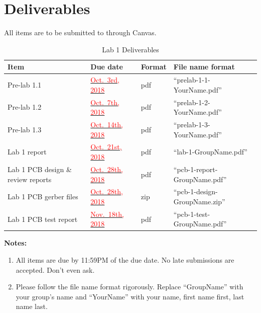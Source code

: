 \documentclass[letterpaper, 11pt]{article}
\newcommand{\due}[1]{\href{https://github.com/ucdart/UCD-EEC134/blob/master/support/schedule/eec134-schedule.pdf}{\textcolor{red}{#1}}}
\begin{document}
\newpage
\section{Deliverables}
All items are to be submitted to through Canvas.  

\vspace{0.5cm}

\begin{table}[h]
	\footnotesize
	\caption{Lab 1 Deliverables}
	\renewcommand{\arraystretch}{1.2}
	\begin{tabular}{|m{1in}|l|m{0.45in}|m{2in}|}
		\hline
		\textbf{Item} & \textbf{Due date} & \textbf{Format} & \textbf{File name format} \\
		\hline \hline
		Pre-lab 1.1 & \due{Oct.~3rd, 2018 } & pdf & ``prelab-1-1-YourName.pdf'' \\
		\hline
		Pre-lab 1.2 & \due{Oct.~7th, 2018} & pdf & ``prelab-1-2-YourName.pdf''\\
		\hline
		Pre-lab 1.3 & \due{Oct.~14th, 2018} & pdf & ``prelab-1-3-YourName.pdf''\\
		\hline
		Lab 1 report & \due{Oct.~21st, 2018 } & pdf & ``lab-1-GroupName.pdf''\\
		\hline
		Lab 1 PCB design \& review reports & \due{Oct.~28th, 2018 } & pdf & ``pcb-1-report-GroupName.pdf''\\
		\hline
		Lab 1 PCB gerber files & \due{Oct.~28th, 2018 } & zip & ``pcb-1-design-GroupName.zip''\\
		\hline
		Lab 1 PCB test report & \due{Nov.~18th, 2018 } & pdf & ``pcb-1-test-GroupName.pdf''\\
		\hline
	\end{tabular}
	\label{tab:deliverables}
\end{table}

\textbf{Notes:}
\begin{enumerate}
	\item All items are due by 11:59PM of the due date. No late submissions are accepted. Don't even ask. 
	
	\item Please follow the file name format rigorously. Replace ``GroupName'' with your group's name and ``YourName'' with your name, first name first, last name last. 
\end{enumerate}
\end{document}
